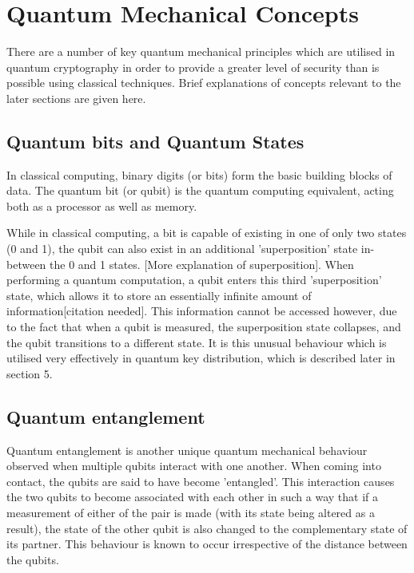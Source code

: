 \documentclass[runningheads,a4paper]{llncs}
\begin{document}
\section{Quantum Mechanical Concepts}

There are a number of key quantum mechanical principles which are utilised in quantum cryptography in order to provide a greater level of security than is possible using classical techniques. Brief explanations of concepts relevant to the later sections are given here.

\subsection{Quantum bits and Quantum States}

In classical computing, binary digits (or bits) form the basic building blocks of data. The quantum bit (or qubit) is the quantum computing equivalent, acting both as a processor as well as memory. 

While in classical computing, a bit is capable of existing in one of only two states (0 and 1), the qubit can also exist in an additional 'superposition' state in-between the 0 and 1 states. [More explanation of superposition]. When performing a quantum computation, a qubit enters this third 'superposition' state, which allows it to store an essentially infinite amount of information[citation needed]. This information cannot be accessed however, due to the fact that when a qubit is measured, the superposition state collapses, and the qubit transitions to a different state. It is this unusual behaviour which is utilised very effectively in quantum key distribution, which is described later in section 5.

\subsection{Quantum entanglement}

Quantum entanglement is another unique quantum mechanical behaviour observed when multiple qubits interact with one another. When coming into contact, the qubits are said to have become 'entangled'. This interaction causes the two qubits to become associated with each other in such a way that if a measurement of either of the pair is made (with its state being altered as a result), the state of the other qubit is also changed to the complementary state of its partner. This behaviour is known to occur irrespective of the distance between the qubits\cite{Tegmark:2001qh}.
\end{document}
